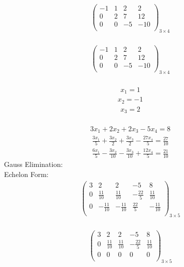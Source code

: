 \documentclass{article}
\begin{document}
\\
\begin{align*}
\left(
\begin{array}{ccc|c}
-1 & 1 & 2 & 2\\
0 & 2 & 7 & 12\\
0 & 0 & -5 & -10\\
\end{array}
\right)_{3\times 4}
\end{align*}
\\
\begin{align*}
\left(
\begin{array}{ccc|c}
-1 & 1 & 2 & 2\\
0 & 2 & 7 & 12\\
0 & 0 & -5 & -10\\
\end{array}
\right)_{3\times 4}
\end{align*}
\\
\begin{align*}
x_{1} = 1\end{align*}
\begin{align*}
x_{2} = -1\end{align*}
\begin{align*}
x_{3} = 2\end{align*}
\\
\begin{align*}
3x_{1} + 2x_{2} + 2x_{3} - 5x_{4} = 8\end{align*}
\begin{align*}
\frac{3x_{1}}{5} + \frac{3x_{2}}{2} + \frac{3x_{3}}{2} - \frac{27x_{4}}{5} = \frac{27}{10}\end{align*}
\begin{align*}
\frac{6x_{1}}{5} - \frac{3x_{2}}{10} - \frac{3x_{3}}{10} + \frac{12x_{4}}{5} = \frac{21}{10}\end{align*}
Gauss Elimination:\\
Echelon Form:\\
\begin{align*}
\left(
\begin{array}{cccc|c}
3 & 2 & 2 & -5 & 8\\
0 & \frac{11}{10} & \frac{11}{10} & -\frac{22}{5} & \frac{11}{10}\\
0 & -\frac{11}{10} & -\frac{11}{10} & \frac{22}{5} & -\frac{11}{10}\\
\end{array}
\right)_{3\times 5}
\end{align*}
\\
\begin{align*}
\left(
\begin{array}{cccc|c}
3 & 2 & 2 & -5 & 8\\
0 & \frac{11}{10} & \frac{11}{10} & -\frac{22}{5} & \frac{11}{10}\\
0 & 0 & 0 & 0 & 0\\
\end{array}
\right)_{3\times 5}
\end{align*}
\end{document}
